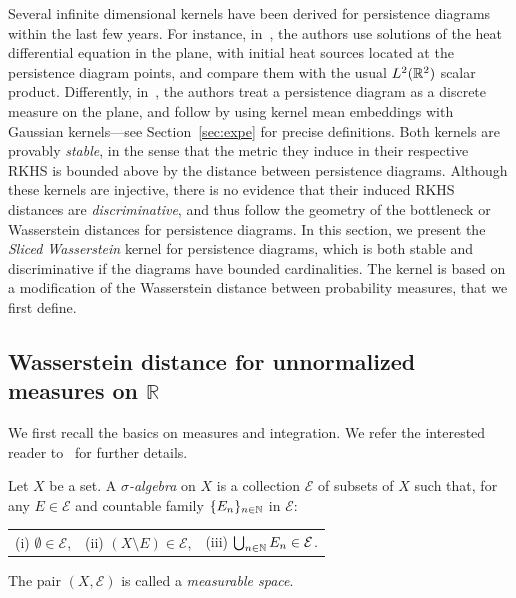 Several infinite dimensional kernels have been derived for persistence diagrams within the last few years.
For instance, in~\cite{Reininghaus15}, the authors use
solutions of the heat differential equation in the plane, with initial heat sources located at the persistence diagram points, and compare them
with the usual $L^2(\mathbb{R}^2)$ scalar product.
Differently, in~\cite{Kusano16}, the authors treat a persistence diagram as a discrete measure on the plane,
and follow by using kernel mean embeddings with Gaussian kernels---see Section~\ref{sec:expe} for precise definitions.
Both kernels are provably {\em stable}, in the sense that the metric they induce in their respective RKHS 
is bounded above by the distance between persistence diagrams. 
Although these kernels are injective, there is no evidence that their induced RKHS distances are {\em discriminative}, and thus follow 
the geometry of the bottleneck or Wasserstein distances for persistence diagrams.
In this section, we present the {\em Sliced Wasserstein} kernel for persistence diagrams, which is 
both stable and discriminative if the diagrams have bounded cardinalities. The kernel is based on a modification of
the Wasserstein distance between probability measures, that we first define. 


\subsection{Wasserstein distance for unnormalized measures on $\mathbb{R}$}
\label{sec:wasserstein}


We first recall the basics on measures and integration. We refer the interested reader to~\cite{Bauer01} for further details.

\begin{defin}
Let $X$ be a set. A {\em $\sigma$-algebra} on $X$ is a collection $\mathcal E$ of subsets of $X$ such
that, for any $E\in\mathcal E$ and countable family $\{E_n\}_{n\in\mathbb{N}}$ in $\mathcal E$:

\begin{tabular}{lll}\vspace{-0.5cm} 
{\rm (i)} $\emptyset\in\mathcal E$, & {\rm (ii)} $(X\setminus E)\in\mathcal E$, &
{\rm (iii)} $\bigcup_{n\in\mathbb{N}}E_n\in\mathcal E$.  
\end{tabular}\vspace{0.5cm} 

The pair $(X,\mathcal E)$ is called a {\em measurable space}.
\end{defin}

